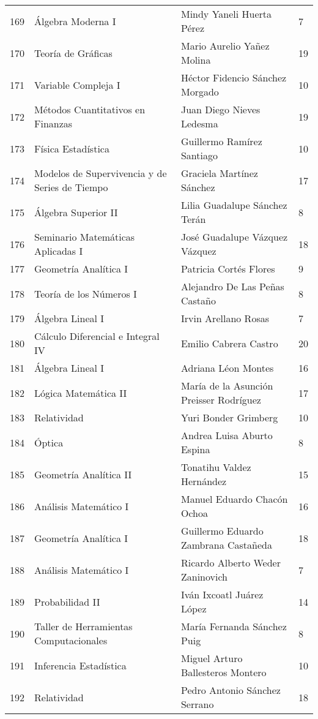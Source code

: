 \begin{table}[ht]
\begin{tabular}{rlll}
  169 & Álgebra Moderna I & Mindy Yaneli Huerta Pérez & 7 \\ 
  170 & Teoría de Gráficas & Mario Aurelio Yañez Molina & 19 \\ 
  171 & Variable Compleja I & Héctor Fidencio Sánchez Morgado & 10 \\ 
  172 & Métodos Cuantitativos en Finanzas & Juan Diego Nieves Ledesma & 19 \\ 
  173 & Física Estadística & Guillermo Ramírez Santiago & 10 \\ 
  174 & Modelos de Supervivencia y de Series de Tiempo & Graciela Martínez Sánchez & 17 \\ 
  175 & Álgebra Superior II & Lilia Guadalupe Sánchez Terán & 8 \\ 
  176 & Seminario Matemáticas Aplicadas I & José Guadalupe Vázquez Vázquez & 18 \\ 
  177 & Geometría Analítica I & Patricia Cortés Flores & 9 \\ 
  178 & Teoría de los Números I & Alejandro De Las Peñas Castaño & 8 \\ 
  179 & Álgebra Lineal I & Irvin Arellano Rosas & 7 \\ 
  180 & Cálculo Diferencial e Integral IV & Emilio Cabrera Castro & 20 \\ 
  181 & Álgebra Lineal I & Adriana Léon Montes & 16 \\ 
  182 & Lógica Matemática II & María de la Asunción Preisser Rodríguez & 17 \\ 
  183 & Relatividad & Yuri Bonder Grimberg & 10 \\ 
  184 & Óptica & Andrea Luisa Aburto Espina & 8 \\ 
  185 & Geometría Analítica II & Tonatihu Valdez Hernández & 15 \\ 
  186 & Análisis Matemático I & Manuel Eduardo Chacón Ochoa & 16 \\ 
  187 & Geometría Analítica I & Guillermo Eduardo Zambrana Castañeda & 18 \\ 
  188 & Análisis Matemático I & Ricardo Alberto Weder Zaninovich & 7 \\ 
  189 & Probabilidad II & Iván Ixcoatl Juárez López & 14 \\ 
  190 & Taller de Herramientas Computacionales & María Fernanda Sánchez Puig & 8 \\ 
  191 & Inferencia Estadística & Miguel Arturo Ballesteros Montero & 10 \\ 
  192 & Relatividad & Pedro Antonio Sánchez Serrano & 18 \\ 

\end{tabular}
\end{table}

